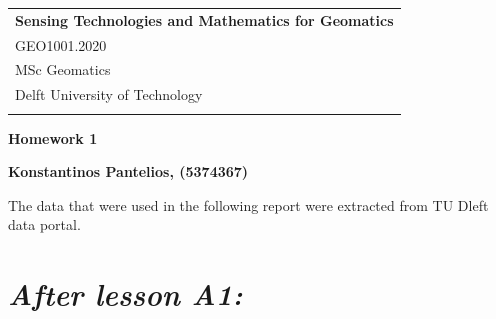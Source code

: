 \documentclass[a4paper,12pt]{article} %
\begin{document}



\thispagestyle{empty} %

\begin{tabular}{p{15.5cm}} %
{\large \bf Sensing Technologies and Mathematics for Geomatics} \\
GEO1001.2020 \\ MSc Geomatics \\ Delft University of Technology \\
\hline %
\\
\end{tabular} %

\vspace*{0.3cm} %

\begin{center} %
	{\Large \bf Homework 1} %
	\vspace{2mm}
	
	{\bf Konstantinos Pantelios, (5374367)} %
		
\end{center}  

\vspace{0.4cm}


The data that were used in the following report were extracted from TU Dleft data portal. \cite{Maiullari2020}


\section{\it After lesson A1:}
\end{document}

